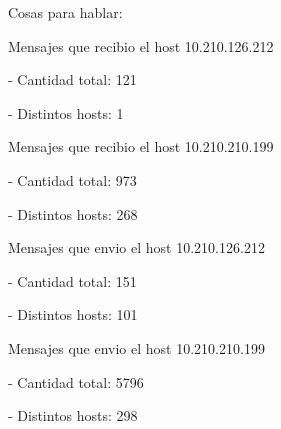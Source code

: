 \par Cosas para hablar:
\par Mensajes que recibio el host 10.210.126.212
\par - Cantidad total: 121
\par - Distintos hosts: 1
\par Mensajes que recibio el host 10.210.210.199
\par - Cantidad total: 973
\par - Distintos hosts: 268
\par Mensajes que envio el host 10.210.126.212
\par - Cantidad total: 151
\par - Distintos hosts: 101
\par Mensajes que envio el host 10.210.210.199
\par - Cantidad total: 5796
\par - Distintos hosts: 298
\\
\newpage
